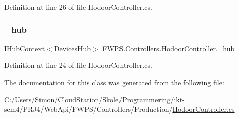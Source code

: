 Definition at line 26 of file Hodoor\+Controller.\+cs.

\mbox{\label{class_f_w_p_s_1_1_controllers_1_1_hodoor_controller_a30e9f233a802a0fa45a43ecec1979db9}} 
\subsubsection{\texorpdfstring{\+\_\+hub}{\_hub}}
{\footnotesize\ttfamily I\+Hub\+Context$<$\mbox{\hyperlink{class_f_w_p_s_1_1_devices_hub}{Devices\+Hub}}$>$ F\+W\+P\+S.\+Controllers.\+Hodoor\+Controller.\+\_\+hub\hspace{0.3cm}{\ttfamily [private]}}



Definition at line 24 of file Hodoor\+Controller.\+cs.



The documentation for this class was generated from the following file\+:\begin{DoxyCompactItemize}
\item 
C\+:/\+Users/\+Simon/\+Cloud\+Station/\+Skole/\+Programmering/ikt-\/sem4/\+P\+R\+J4/\+Web\+Api/\+F\+W\+P\+S/\+Controllers/\+Production/\mbox{\hyperlink{_hodoor_controller_8cs}{Hodoor\+Controller.\+cs}}\end{DoxyCompactItemize}
